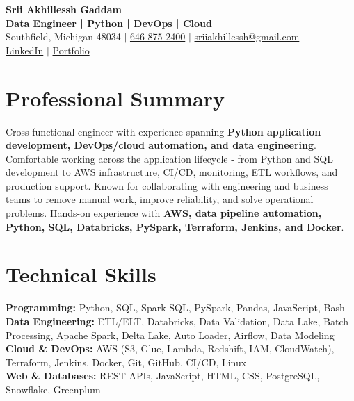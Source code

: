 \documentclass[letterpaper,10pt]{article}
\begin{document}
\fontsize{9.35pt}{10.45pt}\selectfont

\begin{center}
    {\LARGE \textbf{Srii Akhillessh Gaddam}} \\[-1pt]
    \textbf{Data Engineer | Python | DevOps | Cloud} \\[2pt]
    Southfield, Michigan 48034 $|$
    \href{tel:6468752400}{646-875-2400} $|$
    \href{mailto:sriiakhillessh@gmail.com}{sriiakhillessh@gmail.com} \\[1pt]
    \href{https://www.linkedin.com/in/srii-akhiilessh-gaddam-b48668191/}{LinkedIn} $|$
    \href{https://sriiakhillesshg.github.io/portfolio/}{Portfolio}
\end{center}
\vspace{-8pt}

\section{Professional Summary}
\small{Cross-functional engineer with experience spanning \textbf{Python application development, DevOps/cloud automation, and data engineering}. Comfortable working across the application lifecycle - from Python and SQL development to AWS infrastructure, CI/CD, monitoring, ETL workflows, and production support. Known for collaborating with engineering and business teams to remove manual work, improve reliability, and solve operational problems. Hands-on experience with \textbf{AWS, data pipeline automation, Python, SQL, Databricks, PySpark, Terraform, Jenkins, and Docker}.}

\section{Technical Skills}
\small{
\textbf{Programming:} Python, SQL, Spark SQL, PySpark, Pandas, JavaScript, Bash \\
\textbf{Data Engineering:} ETL/ELT, Databricks, Data Validation, Data Lake, Batch Processing, Apache Spark, Delta Lake, Auto Loader, Airflow, Data Modeling \\
\textbf{Cloud \& DevOps:} AWS (S3, Glue, Lambda, Redshift, IAM, CloudWatch), Terraform, Jenkins, Docker, Git, GitHub, CI/CD, Linux \\
\textbf{Web \& Databases:} REST APIs, JavaScript, HTML, CSS, PostgreSQL, Snowflake, Greenplum
}
\end{document}
